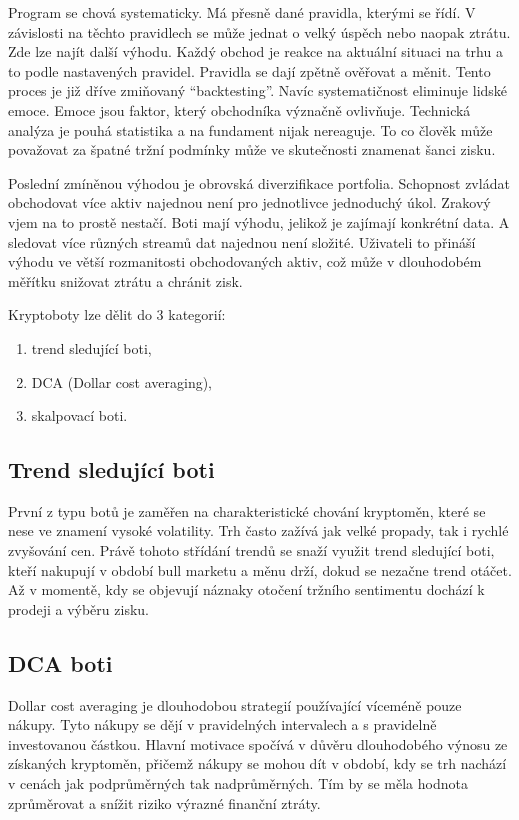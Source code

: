 Program se chová systematicky. Má přesně dané pravidla, kterými se řídí. V závislosti na těchto pravidlech se může jednat o velký úspěch nebo naopak ztrátu. Zde lze
najít další výhodu. Každý obchod je reakce na aktuální situaci na trhu a to podle nastavených pravidel. Pravidla se dají zpětně ověřovat a měnit. Tento proces je již
dříve zmiňovaný \enquote{backtesting}. Navíc systematičnost eliminuje lidské emoce. Emoce jsou faktor, který obchodníka význačně ovlivňuje. Technická analýza je pouhá
statistika a na fundament nijak nereaguje. To co člověk může považovat za špatné tržní podmínky může ve skutečnosti znamenat šanci zisku.

Poslední zmíněnou výhodou je obrovská diverzifikace portfolia. Schopnost zvládat obchodovat více aktiv najednou není pro jednotlivce jednoduchý úkol. Zrakový vjem
na to prostě nestačí. Boti mají výhodu, jelikož je zajímají konkrétní data. A sledovat více různých streamů dat najednou není složité. Uživateli
to přináší výhodu ve větší rozmanitosti obchodovaných aktiv, což může v dlouhodobém měřítku snižovat ztrátu a chránit zisk. \cite{cryptobots:what-are}

Kryptoboty lze dělit do 3 kategorií:
\begin{enumerate}
    \item trend sledující boti,
    \item DCA (Dollar cost averaging),
    \item skalpovací boti.
\end{enumerate}

\subsection{Trend sledující boti}
První z typu botů je zaměřen na charakteristické chování kryptoměn, které se nese ve znamení vysoké volatility. Trh často zažívá jak velké propady, tak i rychlé zvyšování cen.
Právě tohoto střídání trendů se snaží využit trend sledující boti, kteří nakupují v období bull marketu a měnu drží, dokud se nezačne trend otáčet. Až v momentě, kdy se objevují
náznaky otočení tržního sentimentu dochází k prodeji a výběru zisku.

\subsection{DCA boti}
Dollar cost averaging je dlouhodobou strategií používající víceméně pouze nákupy. Tyto nákupy se dějí v pravidelných intervalech a s pravidelně investovanou částkou.
Hlavní motivace spočívá v důvěru dlouhodobého výnosu ze získaných kryptoměn, přičemž nákupy se mohou dít v období, kdy se trh nachází v cenách jak podprůměrných tak
nadprůměrných. Tím by se měla hodnota zprůměrovat a snížit riziko výrazné finanční ztráty.

